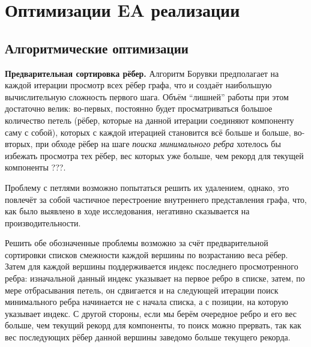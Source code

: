 \documentclass[a4paper,10pt]{extarticle}
\begin{document}



\newpage
\section{Оптимизации EA реализации}
\label{sec:eaopt}

\subsection{Алгоритмические оптимизации}

\textbf{Предварительная сортировка рёбер.}
Алгоритм Борувки предполагает на каждой итерации просмотр всех рёбер графа, что и создаёт наибольшую вычислительную сложность первого шага.
Объём ``лишней'' работы при этом достаточно велик: во-первых, постоянно будет просматриваться большое количество петель (рёбер, которые на данной итерации соединяют компоненту саму с собой), которых с каждой итерацией становится всё больше и больше, во-вторых, при обходе рёбер на шаге \textit{поиска минимального ребра} хотелось бы избежать просмотра тех рёбер, вес которых уже больше, чем рекорд для текущей компоненты ???.

Проблему с петлями возможно попытаться решить их удалением, однако, это повлечёт за собой частичное перестроение внутреннего представления графа, что, как было выявлено в ходе исследования, негативно сказывается на производительности.

Решить обе обозначенные проблемы возможно за счёт предварительной сортировки списков смежности каждой вершины по возрастанию веса рёбер. Затем для каждой вершины поддерживается индекс последнего просмотренного ребра: изначальной данный индекс указывает на первое ребро в списке, затем, по мере отбрасывания петель, он сдвигается и на следующей итерации поиск минимального ребра начинается не с начала списка, а с позиции, на которую указывает индекс. С другой стороны, если мы берём очередное ребро и его вес больше, чем текущий рекорд для компоненты, то поиск можно прервать, так как вес последующих рёбер данной вершины заведомо больше текущего рекорда.
\end{document}
